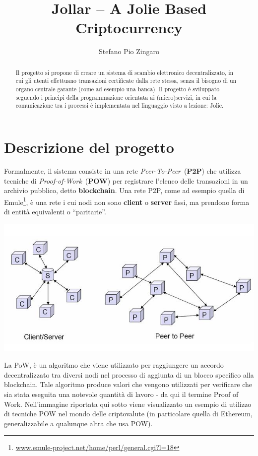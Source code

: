 \documentclass[12pt,a4paper,draft]{article}
\title{Jollar -- A Jolie Based Criptocurrency}
\author{Stefano Pio Zingaro}
\begin{document}
\maketitle

\begin{abstract}
Il progetto si propone di creare un sistema di scambio elettronico decentralizzato, in cui gli utenti effettuano transazioni certificate dalla rete stessa, senza il bisogno di un organo centrale garante (come ad esempio una banca). Il progetto è sviluppato seguendo i principi della programmazione orientata ai (micro)servizi, in cui la comunicazione tra i processi è implementata nel linguaggio visto a lezione: Jolie.
\end{abstract}

\section{Descrizione del progetto}
%
Formalmente, il sistema consiste in una rete \textit{Peer-To-Peer}~(\textbf{P2P}) che utilizza tecniche di \textit{Proof-of-Work}~(\textbf{POW}) per registrare l'elenco delle transazioni in un archivio pubblico, detto \textbf{blockchain}. 
Una rete P2P, come ad esempio quella di Emule\footnote{\url{www.emule-project.net/home/perl/general.cgi?l=18}}, è una rete i cui nodi non sono \textbf{client} o \textbf{server} fissi, ma prendono forma di entità equivalenti o ``paritarie''.
%
\begin{center}
    \includegraphics[width=.7\linewidth]{img/p2p}
\end{center}
%
La PoW, è un algoritmo che viene utilizzato per raggiungere un accordo decentralizzato tra diversi nodi nel processo di aggiunta di un blocco specifico alla blockchain.
Tale algoritmo produce valori che vengono utilizzati per verificare che sia stata eseguita una notevole quantità di lavoro - da qui il termine Proof of Work. Nell'immagine riportata qui sotto viene visualizzato un esempio di utilizzo di tecniche POW nel mondo delle criptovalute (in particolare quella di Ethereum, generalizzabile a qualunque altra che usa POW).
\end{document}

